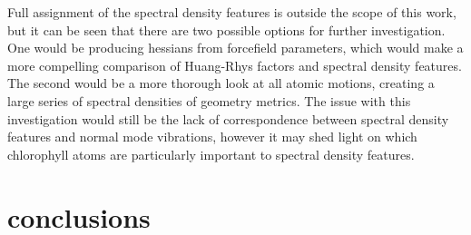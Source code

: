 Full assignment of the spectral density features is outside the scope of this work,
but it can be seen that there are two possible options for further investigation.
One would be producing hessians from forcefield parameters, which would make a more
compelling comparison of Huang-Rhys factors and spectral density features. The second
would be a more thorough look at all atomic motions, creating a large series of 
spectral densities of geometry metrics. The issue with this investigation would 
still be the lack of correspondence between spectral density features and normal
mode vibrations, however it may shed light on which chlorophyll atoms are particularly
important to spectral density features.

\section{conclusions}
\label{sec:specdens_concs}
